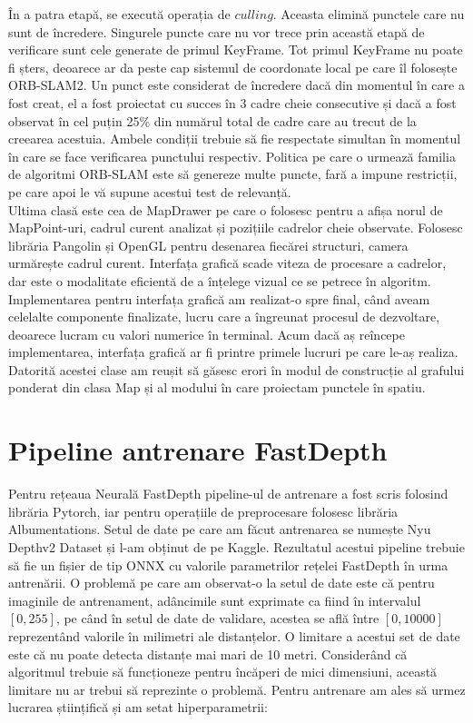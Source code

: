 \documentclass[12pt,a4paper]{report}
\begin{document}
În a patra etapă, se execută operația de $ culling $. Aceasta elimină punctele care nu sunt
de încredere. Singurele puncte care nu vor trece prin această etapă de verificare sunt
cele generate de primul KeyFrame. Tot primul KeyFrame nu poate fi șters, deoarece 
ar da peste cap sistemul de coordonate local pe care îl folosește ORB-SLAM2. Un punct 
este considerat de încredere dacă din momentul în care a fost creat, el a fost proiectat cu succes  
 în 3 cadre cheie consecutive și dacă a fost observat în cel puțin 25\% din 
numărul total de cadre care au trecut de la creearea acestuia. Ambele condiții 
trebuie să fie respectate simultan în momentul în care se face verificarea punctului
respectiv. Politica pe care o urmează familia de algoritmi ORB-SLAM este să genereze 
multe puncte, fară a impune restricții, pe care apoi le vă supune acestui test de 
relevanță. \\

Ultima clasă este cea de MapDrawer pe care o folosesc pentru a afișa norul de MapPoint-uri,
cadrul curent analizat și pozițiile cadrelor cheie observate. Folosesc librăria Pangolin și 
OpenGL pentru desenarea fiecărei structuri, camera urmărește cadrul curent. Interfața grafică 
scade viteza de procesare a cadrelor, dar este o modalitate eficientă de a înțelege vizual ce 
se petrece în algoritm. Implementarea pentru interfața grafică am realizat-o spre final, când 
aveam celelalte componente finalizate, lucru care a îngreunat procesul de dezvoltare, deoarece 
lucram cu valori numerice în terminal. Acum dacă aș reîncepe implementarea, interfața grafică ar fi
printre primele lucruri pe care le-aș realiza. Datorită acestei clase am reușit să găsesc erori în
modul de construcție al grafului ponderat din clasa Map și al modului în care proiectam punctele 
în spatiu.

\section{Pipeline antrenare FastDepth}

Pentru rețeaua Neurală FastDepth pipeline-ul de antrenare a fost scris folosind librăria Pytorch,
iar pentru operațiile de preprocesare folosesc librăria Albumentations. Setul de date pe care
am făcut antrenarea se numește Nyu Depthv2 Dataset\cite{nyudataset} și l-am obținut de pe Kaggle. Rezultatul
acestui pipeline trebuie să fie un fișier de tip ONNX cu valorile parametrilor rețelei FastDepth
în urma antrenării. O problemă pe care am observat-o la setul de date este că
pentru imaginile de antrenament, adâncimile sunt exprimate ca fiind în intervalul $ [0, 255] $, pe când în setul
de date de validare, acestea se află între $ [0, 10000] $ reprezentând valorile în milimetri ale
distanțelor. O limitare a acestui set de date este că nu poate detecta distanțe mai mari de 10 metri.
Considerând că algoritmul trebuie să funcționeze pentru încăperi de mici dimensiuni, această limitare nu ar
trebui să reprezinte o problemă. Pentru antrenare am ales să urmez lucrarea științifică\cite{fastdepth} și am
setat hiperparametrii:
\end{document}
